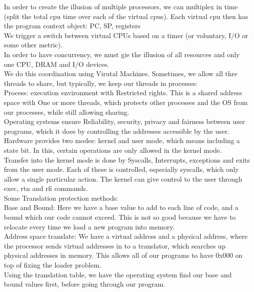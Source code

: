 \documentclass[paper=a4, fontsize=11pt]{scrartcl} %
\numberwithin{equation}{section} %
\numberwithin{figure}{section} %
\numberwithin{table}{section} %
\begin{document}
In order to create the illusion of multiple processors, we can multiplex in time (split the total cpu time over each of the virtual cpus). Each virtual cpu then has the program context object: PC, SP, registers\\
We trigger a switch between virtual CPUs based on a timer (or voluntary, I/O or some other metric).\\
In order to have concurrency, we must gie the illusion of all resources and only one CPU, DRAM and I/O devices.\\
We do this coordination using Virutal Machines. Sometimes, we allow all thre threads to share, but typically, we keep our threads in processes:\\
Process: execution environment with Restricted rights. This is a shared address space with One or more threads, which protects other processes and the OS from our processes, while still allowing sharing.\\
Operating systems ensure Reliability, security, privacy and fairness between user programs, which it does by controlling the addresses accessible by the user.\\
Hardware provides two modes: kernel and user mode, which means including a state bit. In this, certain operations are only allowed in the kernel mode. \\
Transfer into the kernel mode is done by Syscalls, Interrupts, exceptions and exits from the user mode. Each of these is controlled, especially syscalls, which only allow a single particular action. The kernel can give control to the user through exec, rtn and rfi commands.\\
Some Translation protection methods: \\
Base and Bound: Here we have a base value to add to each line of code, and a bound which our code cannot exceed. This is not so good because we have to relocate every time we load a new program into memory.\\
Address space translate: We have a virtual address and a physical address, where the processor sends virtual addresses in to a translator, which searches up physical addresses in memory. This allows all of our programs to have 0x000 on top of fixing the loader problem.\\
Using the translation table, we have the operating system find our base and bound values first, before going through our program.
\end{document}
